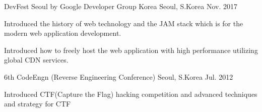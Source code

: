 

\begin{cventries}

	{DevFest Seoul by Google Developer Group Korea} %
	{Seoul, S.Korea} %
	{Nov. 2017} %
	{
		\begin{cvitems} %
			\item {Introduced the history of web technology and the JAM stack which is for the modern web application development.}
			\item {Introduced how to freely host the web application with high performance utilizing global CDN services.}
		\end{cvitems}
	}

	{6th CodeEngn (Reverse Engineering Conference)} %
	{Seoul, S.Korea} %
	{Jul. 2012} %
	{
		\begin{cvitems} %
			\item {Introduced CTF(Capture the Flag) hacking competition and advanced techniques and strategy for CTF}
		\end{cvitems}
	}

\end{cventries}
